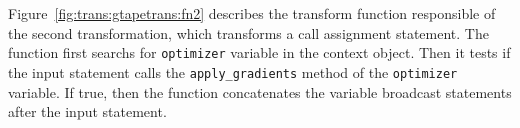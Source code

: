 \begin{inred}
Figure~\ref{fig:trans:gtapetrans:fn2} describes the transform function responsible
of the second transformation,
which transforms a call assignment statement.
The function first searchs for {\tt optimizer} variable in the context object.
Then it tests if the input statement calls the {\tt apply\_gradients} method 
of the {\tt optimizer} variable.
If true, then the function concatenates the variable broadcast statements
after the input statement.
\end{inred}


% 
% 

